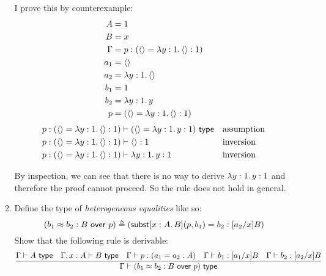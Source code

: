 \documentclass[10pt,\jkfside,a4paper]{article}
\newcommand{\subst}{\ensuremath{\mathsf{subst}}\xspace}
\begin{document}
\begin{enumerate}
\begin{enumerate}
        I prove this by counterexample:
        \begin{align*}
            A &= 1 \\
            B &= x \\
            \Gamma &= p: (\langle\rangle = \lambda y: 1\ldotp \langle\rangle: 1) \\
            a_1 &= \langle \rangle \\
            a_2 &= \lambda y: 1\ldotp \langle \rangle \\
            b_1 &= 1 \\
            b_2 &= \lambda y: 1\ldotp y \\
            p &= (\langle\rangle = \lambda y: 1\ldotp \langle\rangle: 1) \\
        \end{align*}
        \begin{align*}
            & p: (\langle\rangle = \lambda y: 1\ldotp \langle\rangle: 1) \vdash (\langle\rangle = \lambda y: 1\ldotp y: 1)\ \type \why{assumption} \\
            & p: (\langle\rangle = \lambda y: 1\ldotp \langle\rangle: 1) \vdash \langle\rangle: 1 \why{inversion} \\
            & p: (\langle\rangle = \lambda y: 1\ldotp \langle\rangle: 1) \vdash \lambda y: 1\ldotp y: 1 \why{inversion}
        \end{align*}

        By inspection, we can see that there is no way to derive $\lambda y: 1\ldotp y: 1$ and therefore the proof cannot proceed. So the rule does not hold in general.

        \item Define the type of \textit{heterogeneous equalities} like so:
        \[
            (b_1 \approx b_2:B\ \mathsf{over}\ p) \triangleq (\subst[x: A\ldotp B]( p, b_1 ) = b_2: [a_2/x]B)
        \]
        Show that the following rule is derivable:
        \[
            \frac{
                \Gamma \vdash A\ \type
                \quad
                \Gamma, x: A \vdash B\ \type
                \quad
                \Gamma \vdash p: (a_1 = a_2: A)
                \quad
                \Gamma \vdash b_1: [a_1/x]B
                \quad
                \Gamma \vdash b_2: [a_2/x]B
            }{
                \Gamma \vdash (b_1 \approx b_2: B\ \mathsf{over}\ p)\ \type
            }
        \]

        \begin{sidewaysfigure}
            \centering


\end{sidewaysfigure}
\end{enumerate}
\end{enumerate}
\end{document}
